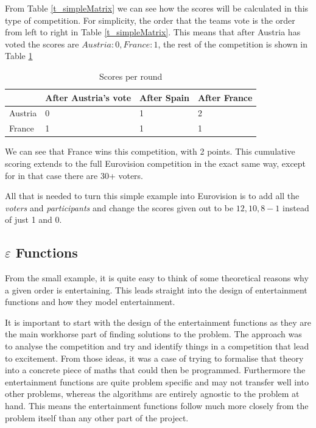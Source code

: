 \documentclass[12pt]{report}
\begin{document}
From Table \ref{t_simpleMatrix} we can see how the scores will be calculated in this type of competition. For simplicity, the order that the teams vote is the order from left to right in Table \ref{t_simpleMatrix}. This means that after Austria has voted the scores are $Austria: 0, France: 1$, the rest of the competition is shown in Table \ref{t_simpleScores}

\begin{table}[H]
\centering
\caption{Scores per round}
\label{t_simpleScores}
\begin{tabular}{@{}|l|l|l|l|@{}}
\toprule
        & After Austria's vote & After Spain & After France \\ \midrule
Austria & 0       & 1     & 2      \\ \midrule
France  & 1       & 1     & 1      \\ \bottomrule
\end{tabular}
\end{table}

We can see that France wins this competition, with 2 points. This cumulative scoring extends to the full Eurovision competition in the exact same way, except for in that case there are 30+ voters.

All that is needed to turn this simple example into Eurovision is to add all the \textit{voters} and \textit{participants} and change the scores given out to be $12, 10, 8-1$ instead of just 1 and 0.

\subsection{$\varepsilon$ Functions}\label{EntertainmentFunction}
From the small example, it is quite easy to think of some theoretical reasons why a given order is entertaining. This leads straight into the design of entertainment functions and how they model entertainment. 

It is important to start with the design of the entertainment functions as they are the main workhorse part of finding solutions to the problem. The approach was to analyse the competition and try and identify things in a competition that lead to excitement. From those ideas, it was a case of trying to formalise that theory into a concrete piece of maths that could then be programmed. Furthermore the entertainment functions are quite problem specific and may not transfer well into other problems, whereas the algorithms are entirely agnostic to the problem at hand. This means the entertainment functions follow much more closely from the problem itself than any other part of the project.
\end{document}
